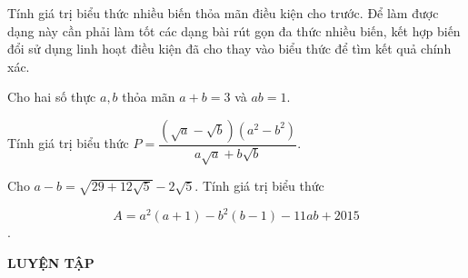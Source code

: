 \begin{dang}{Tính giá trị biểu thức nhiều biến thỏa mãn điều kiện cho trước. }
	Để làm được dạng này cần phải làm tốt các dạng bài rút gọn đa thức nhiều biến, kết hợp biến đổi sử dụng linh hoạt điều kiện đã cho thay vào biểu thức để tìm kết quả chính xác. 
\end{dang}

\begin{vd}%
	Cho hai số thực $a,b$ thỏa mãn $a+b=3$ và $ab=1$.
	
	Tính giá trị biểu thức $P=\dfrac{\left(\sqrt{a}-\sqrt{b}\right)(a^2-b^2)}{a\sqrt{a}+b\sqrt{b}}$.
\end{vd}
\begin{vd}%
	
	Cho $a-b=\sqrt{29+12\sqrt{5}}-2\sqrt{5}$. Tính giá trị biểu thức
	
	$$A=a^2(a+1)-b^2(b-1)-11ab+2015$$.
\end{vd}
\begin{center}
	\textbf{LUYỆN TẬP}
\end{center}

